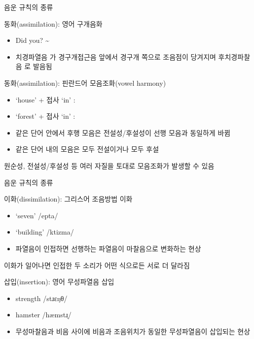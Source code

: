 \documentclass[11pt, aspectratio=169]{beamer}
\newcommand{\textds}[1]{{\ipafont #1}}
\begin{document}
\begin{frame}[t]{음운 규칙의 종류}
    \begin{block}{동화(assimilation): 영어 구개음화}
        \begin{itemize}
            \item Did you? \textds{[dɪd.ju]} \textasciitilde \textds{[dɪdʒu]}
            \item [] 치경파열음 \textds{[d]}가 경구개접근음 \textds{[j]} 앞에서 경구개 쪽으로 조음점이 당겨지며 후치경파찰음 \textds{[dʒ]}로 발음됨
        \end{itemize}
    \end{block}
    \begin{block}{동화(assimilation): 핀란드어 모음조화(vowel harmony)}
        \begin{itemize}
            \item ‘house’ \textds{[tɑlo]} + 접사 ‘in’ : \textds{[tɑlo-ssɑ]}
            \item ‘forest’ \textds{[metsæ]} + 접사 ‘in’ : \textds{[metsæ-ssæ]}
            \item [] 같은 단어 안에서 후행 모음은 전설성/후설성이 선행 모음과 동일하게 바뀜
            \item [] 같은 단어 내의 모음은 모두 전설이거나 모두 후설
        \end{itemize}
    \end{block}
    원순성, 전설성/후설성 등 여러 자질을 토대로 모음조화가 발생할 수 있음
\end{frame}

\begin{frame}[t]{음운 규칙의 종류}
    \begin{block}{이화(dissimilation): 그리스어 조음방법 이화}
        \begin{itemize}
            \item ‘seven’ \textds{/epta/} \rightarrow \textds{[efta]}
            \item ‘building’ \textds{/ktizma/} \rightarrow \textds{[xtizma]}
            \item [] 파열음이 인접하면 선행하는 파열음이 마찰음으로 변화하는 현상
        \end{itemize}
    \end{block}
    이화가 일어나면 인접한 두 소리가 어떤 식으로든 서로 더 달라짐
    \begin{block}{삽입(insertion): 영어 무성파열음 삽입}
        \begin{itemize}
            \item strength \textds{/stɹɛŋθ/} \rightarrow \textds{[stɹɛŋkθ]}
            \item hamster \textds{/hæmstɹ̩/} \rightarrow \textds{[hæmpstɹ̩]}
            \item [] 무성마찰음과 비음 사이에 비음과 조음위치가 동일한 무성파열음이 삽입되는 현상
        \end{itemize}
    \end{block}
\end{frame}
\end{document}
